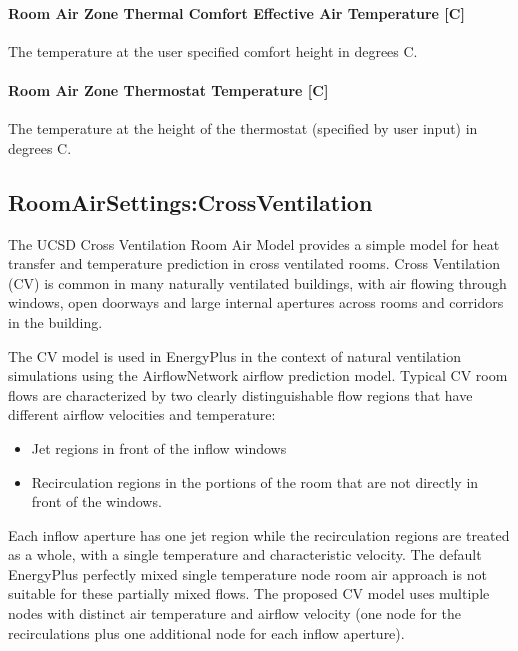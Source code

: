 \paragraph{Room Air Zone Thermal Comfort Effective Air Temperature {[}C{]}}\label{room-air-zone-thermal-comfort-effective-air-temperature-c}

The temperature at the user specified comfort height in degrees C.

\paragraph{Room Air Zone Thermostat Temperature {[}C{]}}\label{room-air-zone-thermostat-temperature-c}

The temperature at the height of the thermostat (specified by user input) in degrees C.

\subsection{RoomAirSettings:CrossVentilation}\label{roomairsettingscrossventilation}

The UCSD Cross Ventilation Room Air Model provides a simple model for heat transfer and temperature prediction in cross ventilated rooms. Cross Ventilation (CV) is common in many naturally ventilated buildings, with air flowing through windows, open doorways and large internal apertures across rooms and corridors in the building.

The CV model is used in EnergyPlus in the context of natural ventilation simulations using the AirflowNetwork airflow prediction model. Typical CV room flows are characterized by two clearly distinguishable flow regions that have different airflow velocities and temperature:

\begin{itemize}
\item
  Jet regions in front of the inflow windows
\item
  Recirculation regions in the portions of the room that are not directly in front of the windows.
\end{itemize}

Each inflow aperture has one jet region while the recirculation regions are treated as a whole, with a single temperature and characteristic velocity. The default EnergyPlus perfectly mixed single temperature node room air approach is not suitable for these partially mixed flows. The proposed CV model uses multiple nodes with distinct air temperature and airflow velocity (one node for the recirculations plus one additional node for each inflow aperture).

